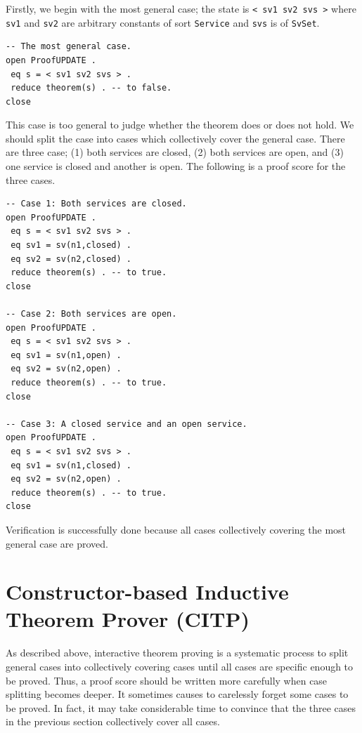 \documentclass[12pt]{report}
\newcommand{\stt}[1]{{\small{\tt {#1}}}}
\begin{document}
Firstly, we begin with the most general case; the state is
\stt{<~sv1~sv2~svs~>} where {\tt sv1} and {\tt sv2} are arbitrary
constants of sort {\tt Service} and {\tt svs} is of {\tt SvSet}.
\begin{verbatim}
-- The most general case.
open ProofUPDATE .
 eq s = < sv1 sv2 svs > .
 reduce theorem(s) . -- to false.
close
\end{verbatim}
This case is too general to judge whether the theorem does or does not
hold.  We should split the case into cases which collectively cover
the general case.  There are three case; (1) both services are closed,
(2) both services are open, and (3) one service is closed and another
is open. The following is a proof score for the three cases.
\begin{verbatim}
-- Case 1: Both services are closed.  
open ProofUPDATE .
 eq s = < sv1 sv2 svs > .  
 eq sv1 = sv(n1,closed) .  
 eq sv2 = sv(n2,closed) .
 reduce theorem(s) . -- to true.  
close

-- Case 2: Both services are open.
open ProofUPDATE .
 eq s = < sv1 sv2 svs > .
 eq sv1 = sv(n1,open) .
 eq sv2 = sv(n2,open) .
 reduce theorem(s) . -- to true.
close

-- Case 3: A closed service and an open service.
open ProofUPDATE .
 eq s = < sv1 sv2 svs > .
 eq sv1 = sv(n1,closed) .
 eq sv2 = sv(n2,open) .
 reduce theorem(s) . -- to true.
close
\end{verbatim}
Verification is successfully done because all cases collectively covering
the most general case are proved.
\section{Constructor-based Inductive Theorem Prover (CITP)}
\label{sec:CITP}
As described above, interactive theorem proving is a systematic
process to split general cases into collectively covering cases until
all cases are specific enough to be proved. Thus, a proof score should
be written more carefully when case splitting becomes deeper. It
sometimes causes to carelessly forget some cases to be proved. In
fact, it may take considerable time to convince that the three cases in
the previous section collectively cover all cases.
\end{document}
